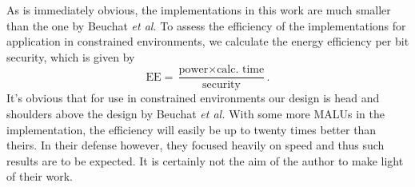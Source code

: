 As is immediately obvious, the implementations in this work are much smaller than the one by Beuchat \emph{et al.} To assess the efficiency of the implementations for application in constrained environments, we calculate the energy efficiency per bit security, which is given by
\begin{displaymath}\text{EE} = \frac{\text{power} \times \text{calc. time}}{\text{security}}.\end{displaymath}
It's obvious that for use in constrained environments our design is head and shoulders above the design by Beuchat \emph{et al.} With some more MALUs in the implementation, the efficiency will easily be up to twenty times better than theirs. In their defense however, they focused heavily on speed and thus such results are to be expected. It is certainly not the aim of the author to make light of their work.
